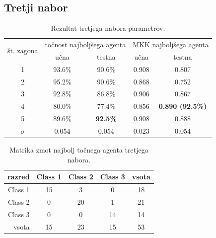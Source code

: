 \subsection{Tretji nabor}\label{subsec:dodatek-wine-tretji-nabor}
\begin{table}[H]
    \begin{center}
        \begin{tabular}{|| c | c c || c c ||}
            \hline
            \multirow{2}{*}{št. zagona} & \multicolumn{2}{c||}{točnost najboljšega agenta} & \multicolumn{2}{c||}{MKK najboljšega agenta} \\ \cline{2-5}
            & učna   & testna          & učna  & testna                  \\
            \hline
            1        & 93.6\% & 90.6\%          & 0.908 & 0.807                   \\
            \hline
            2        & 95.2\% & 90.6\%          & 0.868 & 0.752                   \\
            \hline
            3        & 92.8\% & 86.8\%          & 0.906 & 0.867                   \\
            \hline
            4        & 80.0\% & 77.4\%          & 0.856 & \textbf{0.890 (92.5\%)} \\
            \hline
            5        & 89.6\% & \textbf{92.5\%} & 0.908 & 0.888                   \\
            \hline
            $\sigma$ & 0.054  & 0.054           & 0.023 & 0.054                   \\
            \hline
        \end{tabular}
    \end{center}
    \caption{Rezultat tretjega nabora parametrov.}
    \label{tab:wine_result_3}
\end{table}

\begin{table}[H]
    \centering
    \begin{tabular}{||rcccc||}
        \hline
        razred  & Class 1 & Class 2 & Class 3 & vsota \\ \hline
        Class 1 & 15      & 3       & 0       & 18    \\ \hline
        Class 2 & 0       & 20      & 1       & 21    \\ \hline
        Class 3 & 0       & 0       & 14      & 14    \\ \hline
        vsota   & 15      & 23      & 15      & 53    \\ \hline
    \end{tabular}
    \caption{Matrika zmot najbolj točnega agenta tretjega nabora.}
    \label{tab:wine_acc_3}
\end{table}

